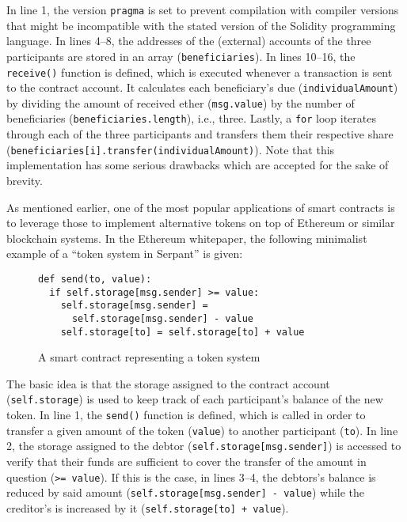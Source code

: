 In line 1, the version \texttt{pragma} is set to prevent compilation with compiler versions that might be incompatible with the stated version of the Solidity programming language.
In lines 4--8, the addresses of the (external) accounts of the three participants are stored in an array (\texttt{beneficiaries}).
In lines 10--16, the \texttt{receive()} function is defined, which is executed whenever a transaction is sent to the contract account.
It calculates each beneficiary's due (\texttt{individualAmount}) by dividing the amount of received ether (\texttt{msg.value}) by the number of beneficiaries (\texttt{beneficiaries.length}), i.e., three.
Lastly, a \texttt{for} loop iterates through each of the three participants and transfers them their respective share (\texttt{beneficiaries[i].transfer(individualAmount)}).
Note that this implementation has some serious drawbacks which are accepted for the sake of brevity.

As mentioned earlier, one of the most popular applications of smart contracts is to leverage those to implement alternative tokens on top of Ethereum or similar blockchain systems.
In the Ethereum whitepaper, the following minimalist example of a ``token system in Serpant'' is given: \autocite[20]{blockchainlab2013ethereumwhitepaper}
\\
\begin{figure}[H]
	\begin{lstlisting}
def send(to, value):
  if self.storage[msg.sender] >= value:
    self.storage[msg.sender] =
      self.storage[msg.sender] - value
    self.storage[to] = self.storage[to] + value
	\end{lstlisting}
	\caption*{A smart contract representing a token system}
\end{figure}

The basic idea is that the storage assigned to the contract account (\texttt{self.storage}) is used to keep track of each participant's balance of the new token.
In line 1, the \texttt{send()} function is defined, which is called in order to transfer a given amount of the token (\texttt{value}) to another participant (\texttt{to}).
In line 2, the storage assigned to the debtor (\texttt{self.storage[msg.sender]}) is accessed to verify that their funds are sufficient to cover the transfer of the amount in question (\texttt{>= value}).
If this is the case, in lines 3--4, the debtors's balance is reduced by said amount (\texttt{self.storage[msg.sender] - value}) while the creditor's is increased by it (\texttt{self.storage[to] + value}).

